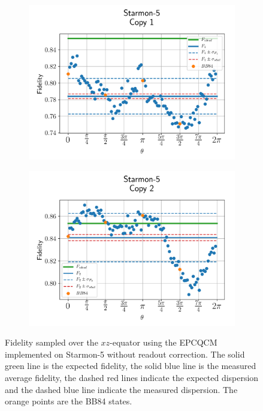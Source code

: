 \begin{figure}[H]
  \centering
  \begin{subfigure}{.5\textwidth}
    \centering
    \includegraphics[width=\textwidth]{Figures/Economical/Starmon/OnlyEquator/results_starmon_copy1.png}
    \label{fig:epc_uncorrected_starmon_equator_1}
  \end{subfigure}%
  \begin{subfigure}{.5\textwidth}
    \centering
    \includegraphics[width=\textwidth]{Figures/Economical/Starmon/OnlyEquator/results_starmon_copy2.png}
    \label{fig:epc_uncorrected_starmon_equator_2}
  \end{subfigure}
  \vspace{-0.5cm}
  \caption{Fidelity sampled over the $xz$-equator using the EPCQCM implemented on Starmon-5 without readout correction.
  The solid green line is the expected fidelity, the solid blue line is the measured average fidelity, the dashed red lines indicate the expected dispersion and the dashed blue line indicate the measured dispersion. The orange points are the BB84 states.}
  \label{fig:epc_uncorrected_starmon_equator}
\end{figure}

